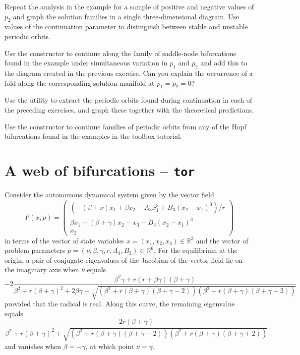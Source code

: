 \begin{exercises}
\item Repeat the analysis in the example for a sample of positive and negative values of $p_2$ and graph the solution families in a single three-dimensional diagram. Use values of the  continuation parameter to distinguish between stable and unstable periodic orbits.
\item Use the  constructor to continue along the family of saddle-node bifurcations found in the example under simultaneous variation in $p_1$ and $p_2$ and add this to the diagram created in the previous exercise. Can you explain the occurrence of a fold along the corresponding solution manifold at $p_1=p_2=0$?
\item Use the  utility to extract the periodic orbits found during continuation in each of the preceding exercises, and graph these together with the theoretical predictions.
\item Use the  constructor to continue families of periodic orbits from any of the Hopf bifurcations found in the examples in the  toolbox tutorial.
\end{exercises}

\section{A web of bifurcations -- \texttt{tor}}
Consider the autonomous dynamical system given by the vector field
\begin{equation}
F(x,p)=\left(\begin{array}{c}( -(\beta+\nu)x_1+\beta x_2  - A_3x_1^3 + B_3(x_2-x_1)^3 )/r\\
\beta x_1 - (\beta+\gamma)x_2 - x_3 - B_3(x_2-x_1)^3\\x_2\end{array}\right)
\end{equation}
in terms of the vector of state variables $x=(x_1,x_2,x_3)\in\mathbb{R}^3$ and the vector of problem parameters $p=(\nu,\beta,\gamma,r,A_3,B_3)\in\mathbb{R}^6$. For the equilibrium at the origin, a pair of conjugate eigenvalues of the Jacobian of the vector field lie on the imaginary axis when $\nu$ equals
\begin{equation}
-2\frac{\beta^2\gamma +r(r+\beta\gamma) (\beta + \gamma) }{\beta^2 +r(\beta+\gamma)^2  + 2\beta \gamma  - 
\sqrt{(\beta^2 + 
    r  (\beta + \gamma)( \beta + \gamma-2)) (\beta^2 + 
    r (\beta + \gamma) ( \beta + \gamma+2))}}
    \label{eq: hopfbif}
\end{equation}
provided that the radical is real. Along this curve, the remaining eigenvalue equals
\begin{equation}
\frac{2r(\beta+\gamma)}{\beta^2 + 
 r (\beta + \gamma)^2 + \sqrt{(\beta^2 + 
    r  (\beta + \gamma)( \beta + \gamma-2)) (\beta^2 + 
    r (\beta + \gamma) ( \beta + \gamma+2))}}
\end{equation}
and vanishes when $\beta=-\gamma$, at which point $\nu=\gamma$.

